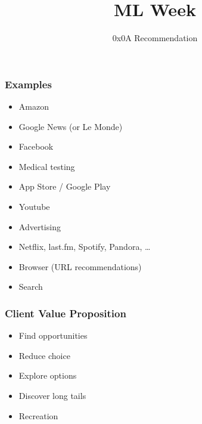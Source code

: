 
\usepackage{centernot}
\usepackage[]{algorithm2e}

\title
{ML Week}
\subtitle{0x0A \hspace{2mm}  Recommendation}




\begin{frame}
  \titlepage
\end{frame}




\begin{frame}
  \frametitle{Examples}
  \begin{itemize}
  \item Amazon
  \item Google News (or Le Monde)
  \item Facebook
  \item Medical testing
  \item App Store / Google Play
  \item Youtube
  \item Advertising
  \item Netflix, last.fm, Spotify, Pandora, \dots
  \item Browser (URL recommendations)
  \item Search
  \end{itemize}
\end{frame}

\begin{frame}
  \frametitle{Client Value Proposition}
  \begin{itemize}
  \item Find opportunities
  \item Reduce choice
  \item Explore options
  \item Discover long tails
  \item Recreation
  \end{itemize}
\end{frame}

